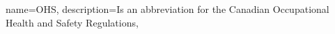 {
  name={OHS},
  description={Is an abbreviation for the Canadian Occupational Health and Safety Regulations},
}

